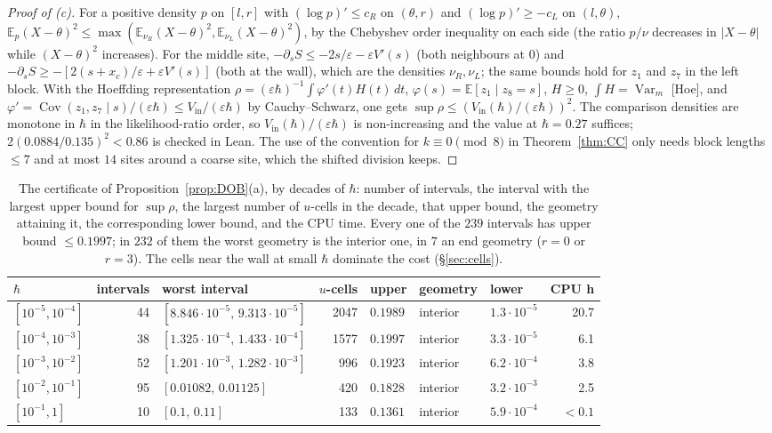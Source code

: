 \documentclass[11pt,a4paper]{article}
\theoremstyle{definition}
\theoremstyle{remark}
\newcommand{\E}{\mathbb{E}}
\newcommand{\Var}{\operatorname{Var}}
\newcommand{\Cov}{\operatorname{Cov}}
\newcommand{\xc}{x_c}
\begin{document}
\begin{proof}[Proof of \textup{(c)}]
For a positive density $p$ on $[l,r]$ with $(\log p)'\le c_R$ on $(\theta,r)$ and $(\log p)'\ge-c_L$ on $(l,\theta)$, $\E_p(X-\theta)^2\le\max(\E_{\nu_R}(X-\theta)^2,\E_{\nu_L}(X-\theta)^2)$, by the Chebyshev order inequality on each side (the ratio $p/\nu$ decreases in $|X-\theta|$ while $(X-\theta)^2$ increases). For the middle site, $-\partial_sS\le-2s/\varepsilon-\varepsilon V'(s)$ (both neighbours at $0$) and $-\partial_sS\ge-[2(s+\xc)/\varepsilon+\varepsilon V'(s)]$ (both at the wall), which are the densities $\nu_R,\nu_L$; the same bounds hold for $z_1$ and $z_7$ in the left block. With the Hoeffding representation $\rho=(\varepsilon\hbar)^{-1}\int\varphi'(t)H(t)\,dt$, $\varphi(s)=\E[z_1\mid z_8=s]$, $H\ge0$, $\int H=\Var_m$ [Hoe], and $\varphi'=\Cov(z_1,z_7\mid s)/(\varepsilon\hbar)\le V_{\mathrm{in}}/(\varepsilon\hbar)$ by Cauchy--Schwarz, one gets $\sup\rho\le(V_{\mathrm{in}}(\hbar)/(\varepsilon\hbar))^2$. The comparison densities are monotone in $\hbar$ in the likelihood-ratio order, so $V_{\mathrm{in}}(\hbar)/(\varepsilon\hbar)$ is non-increasing and the value at $\hbar=0.27$ suffices; $2(0.0884/0.135)^2<0.86$ is checked in Lean. The use of the convention for $k\equiv0\pmod8$ in Theorem~\ref{thm:CC} only needs block lengths $\le7$ and at most $14$ sites around a coarse site, which the shifted division keeps.
\end{proof}

\begin{table}[ht]
\centering\small
\setlength{\tabcolsep}{4pt}\begin{tabular}{@{}lrlrlllr@{}}
\toprule
$\hbar$ & intervals & worst interval & $u$-cells & upper & geometry & lower & CPU h\\
\midrule
$[10^{-5},10^{-4}]$ & 44 & $[8.846\cdot10^{-5},\,9.313\cdot10^{-5}]$ & 2047 & $0.1989$ & interior & $1.3\cdot10^{-5}$ & 20.7\\
$[10^{-4},10^{-3}]$ & 38 & $[1.325\cdot10^{-4},\,1.433\cdot10^{-4}]$ & 1577 & $0.1997$ & interior & $3.3\cdot10^{-5}$ & 6.1\\
$[10^{-3},10^{-2}]$ & 52 & $[1.201\cdot10^{-3},\,1.282\cdot10^{-3}]$ & 996 & $0.1923$ & interior & $6.2\cdot10^{-4}$ & 3.8\\
$[10^{-2},10^{-1}]$ & 95 & $[0.01082,\,0.01125]$ & 420 & $0.1828$ & interior & $3.2\cdot10^{-3}$ & 2.5\\
$[10^{-1},1]$ & 10 & $[0.1,\,0.11]$ & 133 & $0.1361$ & interior & $5.9\cdot10^{-4}$ & $<0.1$\\
\bottomrule
\end{tabular}
\caption{The certificate of Proposition~\ref{prop:DOB}(a), by decades of $\hbar$: number of intervals, the interval with the largest upper bound for $\sup\rho$, the largest number of $u$-cells in the decade, that upper bound, the geometry attaining it, the corresponding lower bound, and the CPU time. Every one of the $239$ intervals has upper bound $\le0.1997$; in $232$ of them the worst geometry is the interior one, in $7$ an end geometry ($r=0$ or $r=3$). The cells near the wall at small $\hbar$ dominate the cost (\S\ref{sec:cells}).}
\label{tab:cert}
\end{table}
\end{document}
